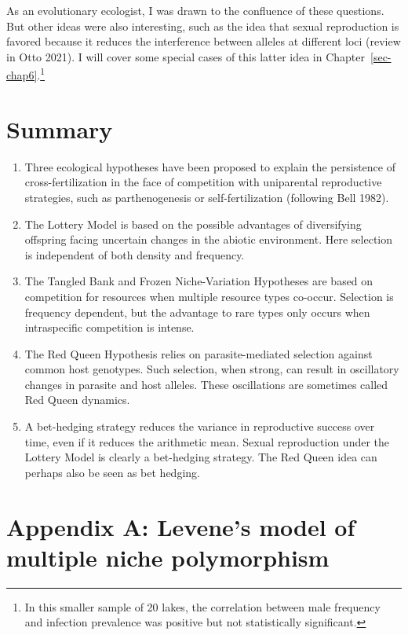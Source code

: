 \documentclass[
  letterpaper,
]{book}
\begin{document}
As an evolutionary ecologist, I was drawn to the confluence of these
questions. But other ideas were also interesting, such as the idea that
sexual reproduction is favored because it reduces the interference
between alleles at different loci (review in Otto 2021). I will cover
some special cases of this latter idea in
Chapter~\ref{sec-chap6}.\footnote{In this smaller sample of 20 lakes,
  the correlation between male frequency and infection prevalence was
  positive but not statistically significant.}

\section{Summary}\label{summary-1}

\begin{enumerate}
\def\labelenumi{\arabic{enumi}.}
\item
  Three ecological hypotheses have been proposed to explain the
  persistence of cross-fertilization in the face of competition with
  uniparental reproductive strategies, such as parthenogenesis or
  self-fertilization (following Bell 1982).
\item
  The Lottery Model is based on the possible advantages of diversifying
  offspring facing uncertain changes in the abiotic environment. Here
  selection is independent of both density and frequency.
\item
  The Tangled Bank and Frozen Niche-Variation Hypotheses are based on
  competition for resources when multiple resource types co-occur.
  Selection is frequency dependent, but the advantage to rare types only
  occurs when intraspecific competition is intense.
\item
  The Red Queen Hypothesis relies on parasite-mediated selection against
  common host genotypes. Such selection, when strong, can result in
  oscillatory changes in parasite and host alleles. These oscillations
  are sometimes called Red Queen dynamics.
\item
  A bet-hedging strategy reduces the variance in reproductive success
  over time, even if it reduces the arithmetic mean. Sexual reproduction
  under the Lottery Model is clearly a bet-hedging strategy. The Red
  Queen idea can perhaps also be seen as bet hedging.
\end{enumerate}

\section{Appendix A: Levene's model of multiple niche
polymorphism}\label{sec-app-a}
\end{document}
